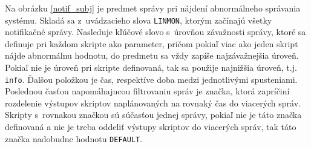 Na obrázku \ref{notif_subj} je predmet správy pri nájdení abnormálneho správania systému. Skladá sa z~uvádzacieho slova \texttt{LINMON}, ktorým začínajú všetky notifikačné správy. Nasleduje kľúčové slovo s~úrovňou závažnosti správy, ktoré sa definuje pri každom skripte ako parameter, pričom pokiaľ viac ako jeden skript nájde abnormálnu hodnotu, do predmetu sa vždy zapíše najzávažnejšia úroveň. Pokiaľ nie je úroveň pri skripte definovaná, tak sa použije najnižšia úroveň, t.j. \texttt{info}. Ďalšou položkou je čas, respektíve doba medzi jednotlivými spusteniami. Poslednou časťou napomáhajucou filtrovaniu správ je značka, ktorá zapríčiní rozdelenie výstupov skriptov naplánovaných na rovnaký čas do viacerých správ. Skripty s~rovnakou značkou sú súčasťou jednej správy, pokiaľ nie je táto značka definovaná a nie je treba oddeliť výstupy skriptov do viacerých správ, tak táto značka nadobudne hodnotu \texttt{DEFAULT}.
\\
\makeatletter
\newif\ifFV@bgcolor
\newbox\FV@bgbox
\define@key{FV}{bgcolor}{\FV@bgcolortrue\def\FV@bgcolor{#1}}

